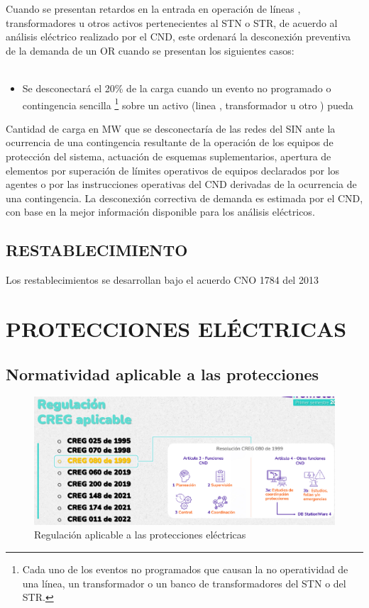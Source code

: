 \documentclass[a5paper]{book}%
\begin{document}
Cuando se presentan retardos en la entrada  en operación de líneas , transformadores u otros activos pertenecientes al \ac{STN} o \ac{STR},  de acuerdo al análisis eléctrico  realizado por el \ac{CND},  este ordenará la desconexión preventiva de la demanda de un \ac{OR} cuando se presentan los siguientes casos: \cite{CREG2242016} \\\\

\begin{itemize}
\item Se desconectará el 20\% de la carga cuando un evento no programado o contingencia sencilla  \footnote[1]{Cada uno de los eventos no programados que causan la no operatividad de una línea, un transformador o un banco de transformadores del STN o del STR.}  sobre un activo (linea , transformador u otro ) pueda 
  \end{itemize}

Cantidad de carga en MW que se desconectaría de las redes del SIN ante la ocurrencia de una contingencia resultante de la operación de los equipos de protección del sistema, actuación de esquemas suplementarios, apertura de elementos por superación de límites operativos de equipos declarados por los agentes o por las instrucciones operativas del CND derivadas de la ocurrencia de una contingencia. La desconexión correctiva de demanda es estimada por el CND, con base en la mejor información disponible para los análisis eléctricos.

\section{RESTABLECIMIENTO}

Los restablecimientos se desarrollan bajo el acuerdo CNO 1784 del 2013

    \chapter{PROTECCIONES ELÉCTRICAS}
    
    \section{Normatividad aplicable a las protecciones}
    
    \begin{figure}[H]
    	\centering
    	\caption{Regulación aplicable a las protecciones eléctricas}
    	\label{fig:regulacionprotecciones}
    	\includegraphics[width=0.9\linewidth]{regulacion_protecciones}
    \end{figure}
    
\end{document}
